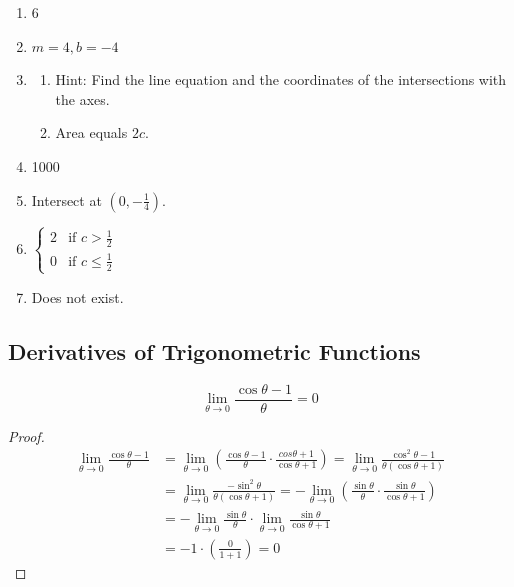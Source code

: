 \documentclass{article}
\begin{document}
\begin{enumerate}
    \begin{enumerate}
        \setcounter{enumii}{2}
      \item $F^{(n)}=f^{(n)}g+\binom{n}{1}f^{(n-1)}g^{(1)}+\binom{n}{2}f^{(n-2)}g^{(2)}+\dots
        +\binom{n}{n-1}f^{(1)}g^{(n-1)}+fg^{(n)}$
    \end{enumerate}
  \item 6
  \item $m=4, b=-4$
    \setcounter{enumi}{105}
  \item
    \begin{enumerate}
      \item Hint: Find the line equation and the coordinates of the intersections with the axes.
      \item Area equals $2c$.
    \end{enumerate}
  \item 1000
  \item Intersect at $(0, -\frac{1}{4})$.
  \item
    $
    \begin{cases}
      2 & \text{if } c > \frac{1}{2} \\
      0 & \text{if } c \le \frac{1}{2}
    \end{cases}$
  \item Does not exist.
\end{enumerate}

\subsection{Derivatives of Trigonometric Functions}
\[\lim_{\theta\to0}\frac{\cos\theta-1}{\theta}=0\]
\begin{proof}
  \begin{align*}
    \lim_{\theta\to0}\frac{\cos\theta-1}{\theta} & =
    \lim_{\theta\to0}\left(\frac{\cos\theta-1}{\theta}\cdot\frac{cos\theta+1}{\cos\theta+1}\right)=
    \lim_{\theta\to0}\frac{\cos^2\theta-1}{\theta(\cos\theta+1)} \\
    & = \lim_{\theta\to0}\frac{-\sin^2\theta}{\theta(\cos\theta+1)} = -\lim_{\theta\to0}
    \left(\frac{\sin\theta}{\theta}\cdot\frac{\sin\theta}{\cos\theta+1}\right) \\
    & = -\lim_{\theta\to0}\frac{\sin\theta}{\theta}\cdot
    \lim_{\theta\to0}\frac{\sin\theta}{\cos\theta+1} \\
    & = -1\cdot\left(\frac{0}{1+1}\right)=0
  \end{align*}
\end{proof}
\end{document}

